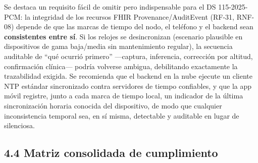 \documentclass[11pt,a4paper]{article}
\begin{document}
Se destaca un requisito fácil de omitir pero indispensable para el DS 115-2025-PCM: la integridad de los recursos FHIR Provenance/AuditEvent (RF-31, RNF-08) depende de que las marcas de tiempo del nodo, el teléfono y el backend sean \textbf{consistentes entre sí}. Si los relojes se desincronizan (escenario plausible en dispositivos de gama baja/media sin mantenimiento regular), la secuencia auditable de ``qué ocurrió primero'' ---captura, inferencia, corrección por altitud, confirmación clínica--- podría volverse ambigua, debilitando exactamente la trazabilidad exigida. Se recomienda que el backend en la nube ejecute un cliente NTP estándar sincronizado contra servidores de tiempo confiables, y que la app móvil registre, junto a cada marca de tiempo local, un indicador de la última sincronización horaria conocida del dispositivo, de modo que cualquier inconsistencia temporal sea, en sí misma, detectable y auditable en lugar de silenciosa.

\subsection{4.4 Matriz consolidada de cumplimiento}\label{matriz-consolidada-de-cumplimiento}
\end{document}
